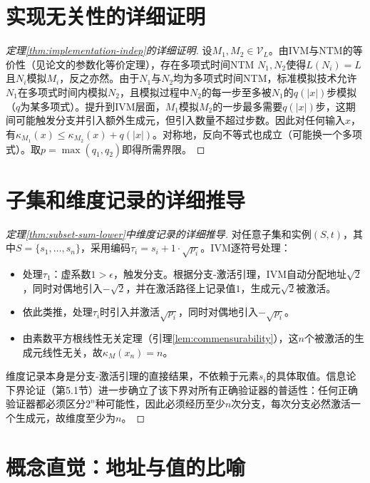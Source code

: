 \documentclass{ctexart}
\newtheorem{proof}[theorem]{证明}
\begin{document}
	\appendix
	
	\section{实现无关性的详细证明}
	
	\begin{proof}[定理\ref{thm:implementation-indep}的详细证明]
		设$M_1,M_2\in\mathcal{V}_L$。由IVM与NTM的等价性（见论文\cite{models2026}的参数化等价定理），存在多项式时间NTM $N_1,N_2$使得$L(N_i)=L$且$N_i$模拟$M_i$，反之亦然。由于$N_1$与$N_2$均为多项式时间NTM，标准模拟技术允许$N_1$在多项式时间内模拟$N_2$，且模拟过程中$N_2$的每一步至多被$N_1$的$q(|x|)$步模拟（$q$为某多项式）。提升到IVM层面，$M_1$模拟$M_2$的一步最多需要$q(|x|)$步，这期间可能触发分支并引入额外生成元，但引入数量不超过步数。因此对任何输入$x$，有$\kappa_{M_1}(x)\le \kappa_{M_2}(x)+q(|x|)$。对称地，反向不等式也成立（可能换一个多项式）。取$p=\max(q_1,q_2)$即得所需界限。
	\end{proof}
	
	\section{子集和维度记录的详细推导}
	
	\begin{proof}[定理\ref{thm:subset-sum-lower}中维度记录的详细推导]
		对任意子集和实例$(S,t)$，其中$S=\{s_1,\dots,s_n\}$，采用编码$\tau_i = s_i + 1\cdot\sqrt{p_i}$。IVM逐符号处理：
		\begin{itemize}
			\item 处理$\tau_1$：虚系数$1>\epsilon$，触发分支。根据分支-激活引理，IVM自动分配地址$\sqrt{2}$，同时对偶地引入$-\sqrt{2}$，并在激活路径上记录值$1$，生成元$\sqrt{2}$被激活。
			\item 依此类推，处理$\tau_i$时引入并激活$\sqrt{p_i}$，同时对偶地引入$-\sqrt{p_i}$。
			\item 由素数平方根线性无关定理（引理\ref{lem:commensurability}），这$n$个被激活的生成元线性无关，故$\kappa_M(x_n) = n$。
		\end{itemize}
		维度记录本身是分支-激活引理的直接结果，不依赖于元素$s_i$的具体取值。信息论下界论证（第5.1节）进一步确立了该下界对所有正确验证器的普适性：任何正确验证器都必须区分$2^n$种可能性，因此必须经历至少$n$次分支，每次分支必然激活一个生成元，故维度至少为$n$。
	\end{proof}
	
	\section{概念直觉：地址与值的比喻}
	
\end{document}
